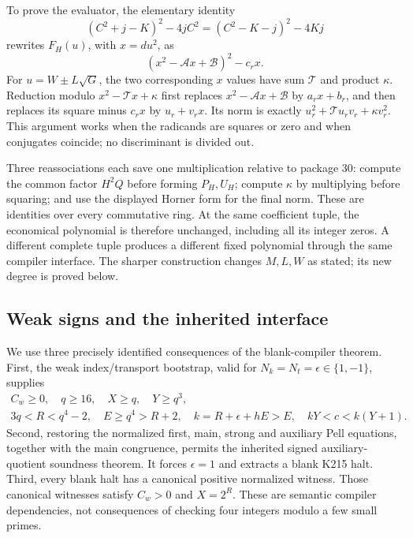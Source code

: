 To prove the evaluator, the elementary identity
\[
 (C^2+j-K)^2-4jC^2=(C^2-K-j)^2-4Kj
\]
rewrites $F_H(u)$, with $x=du^2$, as
\[
 (x^2-\mathcal A x+\mathcal B)^2-c_rx.
\]
For $u=W\pm L\sqrt G$, the two corresponding $x$ values have sum
$\mathcal T$ and product $\kappa$.  Reduction modulo
$x^2-\mathcal T x+\kappa$ first replaces
$x^2-\mathcal A x+\mathcal B$ by $a_rx+b_r$, and then replaces its
square minus $c_rx$ by $u_r+v_rx$.  Its norm is exactly
$u_r^2+\mathcal T u_rv_r+\kappa v_r^2$.  This argument works when the
radicands are squares or zero and when conjugates coincide; no
discriminant is divided out.

Three reassociations each save one multiplication relative to package 30:
compute the common factor $H^2Q$ before forming $P_H,U_H$; compute
$\kappa$ by multiplying before squaring; and use the displayed Horner
form for the final norm.  These are identities over every commutative
ring.  At the same coefficient tuple, the economical polynomial is therefore
unchanged, including all its integer zeros.  A different complete tuple
produces a different fixed polynomial through the same compiler interface.
The sharper construction changes $M,L,W$ as stated;
its new degree is proved below.

\subsection{Weak signs and the inherited interface}

We use three precisely identified consequences of the blank-compiler
theorem.  First, the weak index/transport bootstrap, valid for
$N_k=N_t=\epsilon\in\{1,-1\}$, supplies
\begin{equation}
 \begin{gathered}
 C_w\ge0,\quad q\ge16,\quad X\ge q,\quad Y\ge q^3,\\
 3q<R<q^4-2,\quad E\ge q^4>R+2,\quad
 k=R+\epsilon+hE>E,\quad kY<c<k(Y+1).
 \end{gathered}\label{eq:positive-weak-bootstrap}
\end{equation}
Second, restoring the normalized first, main, strong and auxiliary Pell
equations, together with the main congruence, permits the inherited signed
auxiliary-quotient soundness theorem.  It forces $\epsilon=1$ and extracts
a blank K215 halt.  Third, every blank halt has a canonical positive
normalized witness.  Those canonical witnesses satisfy $C_w>0$ and
$X=2^R$.  These are semantic compiler dependencies, not consequences of
checking four integers modulo a few small primes.


